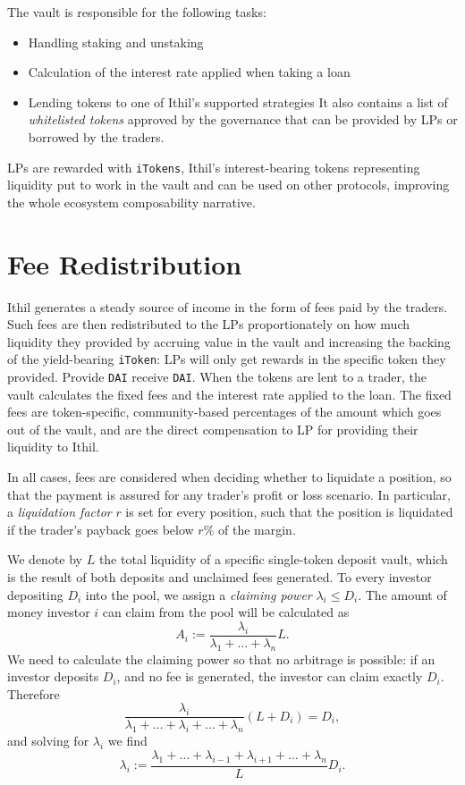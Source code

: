 \documentclass[a4paper,10 pt]{article}
\theoremstyle{definition}
\begin{document}
The vault is responsible for the following tasks:
\begin{itemize}
\item Handling staking and unstaking
\item Calculation of the interest rate applied when taking a loan
\item Lending tokens to one of Ithil's supported strategies
It also contains a list of {\it whitelisted tokens} approved by the governance that can be provided by LPs or borrowed by the traders.
\end{itemize}

LPs are rewarded with \verb|iTokens|, Ithil's interest-bearing tokens representing liquidity put to work in the vault and can be used on other protocols, improving the whole ecosystem composability narrative.

\section{Fee Redistribution}

Ithil generates a steady source of income in the form of fees paid by the traders. Such fees are then redistributed to the LPs proportionately on how much liquidity they provided by accruing value in the vault and increasing the backing of the yield-bearing \verb|iToken|: LPs will only get rewards in the specific token they provided. Provide \verb|DAI| receive \verb|DAI|.
When the tokens are lent to a trader, the vault calculates the fixed fees and the interest rate applied to the loan. The fixed fees are token-specific, community-based percentages of the amount which goes out of the vault, and are the direct compensation to LP for providing their liquidity to Ithil. 

In all cases, fees are considered when deciding whether to liquidate a position, so that the payment is assured for any trader's profit or loss scenario. In particular, a \textit{liquidation factor} $r$ is set for every position, such that the position is liquidated if the trader's payback goes below $r$\% of the margin.

We denote by $L$ the total liquidity of a specific single-token deposit vault, which is the result of both deposits and unclaimed fees generated. To every investor depositing $D_i$ into the pool, we assign a \emph{claiming power} $\lambda_i \le D_i$. The amount of money investor $i$ can claim from the pool will be calculated as $$A_i := \frac{\lambda_i}{\lambda_1+\ldots+\lambda_n}L.$$ We need to calculate the claiming power so that no arbitrage is possible: if an investor deposits $D_i$, and no fee is generated, the investor can claim exactly $D_i$. Therefore
$$ \frac{\lambda_i}{\lambda_1+\ldots+\lambda_i + \ldots +\lambda_n}(L+D_i) = D_i,$$ and solving for $\lambda_i$ we find $$\lambda_i := \frac{\lambda_1 + \ldots + \lambda_{i-1}+\lambda_{i+1}+\ldots+\lambda_n}{L}D_i.$$
\end{document}

